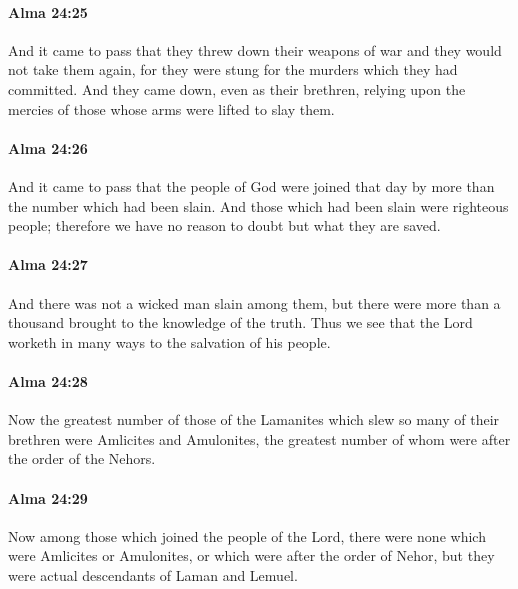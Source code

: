 		\paragraph{Alma 24:25} %
			\label{ALMA-24-25}

			And it came to pass that they threw down their weapons of war
			and they would not take them again,
			for they were stung for the murders which they had committed.
			And they came down, even as their brethren,
			relying upon the mercies of those whose arms were lifted to slay them.

		\paragraph{Alma 24:26} %
			\label{ALMA-24-26}

			And it came to pass that the people of God were joined that day
			by more than the number which had been slain.
			And those which had been slain were righteous people;
			therefore we have no reason to doubt but what they are saved.

		\paragraph{Alma 24:27} %
			\label{ALMA-24-27}

			And there was not a wicked man slain among them,
			but there were more than a thousand brought to the knowledge of the truth.
			Thus we see that the Lord worketh in many ways to the salvation of his people.

		\paragraph{Alma 24:28} %
			\label{ALMA-24-28}

			Now the greatest number of those of the Lamanites
			which slew so many of their brethren
			were Amlicites and Amulonites,
			the greatest number of whom were after the order of the Nehors.

		\paragraph{Alma 24:29} %
			\label{ALMA-24-29}

			Now among those which joined the people of the Lord,
			there were none which were Amlicites or Amulonites,
			or which were after the order of Nehor,
			but they were actual descendants of Laman and Lemuel.

